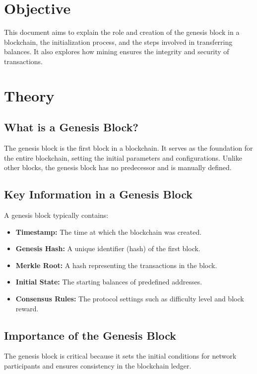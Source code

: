 \documentclass[11pt]{article}
\begin{document}
\tableofcontents
\thispagestyle{empty}
\clearpage

\section{Objective}
This document aims to explain the role and creation of the genesis block in a blockchain, the initialization process, and the steps involved in transferring balances. It also explores how mining ensures the integrity and security of transactions.

\section{Theory}

\subsection{What is a Genesis Block?}
The genesis block is the first block in a blockchain. It serves as the foundation for the entire blockchain, setting the initial parameters and configurations. Unlike other blocks, the genesis block has no predecessor and is manually defined.

\subsection{Key Information in a Genesis Block}
A genesis block typically contains:
\begin{itemize}
    \item \textbf{Timestamp:} The time at which the blockchain was created.
    \item \textbf{Genesis Hash:} A unique identifier (hash) of the first block.
    \item \textbf{Merkle Root:} A hash representing the transactions in the block.
    \item \textbf{Initial State:} The starting balances of predefined addresses.
    \item \textbf{Consensus Rules:} The protocol settings such as difficulty level and block reward.
\end{itemize}

\subsection{Importance of the Genesis Block}
The genesis block is critical because it sets the initial conditions for network participants and ensures consistency in the blockchain ledger.
\end{document}
